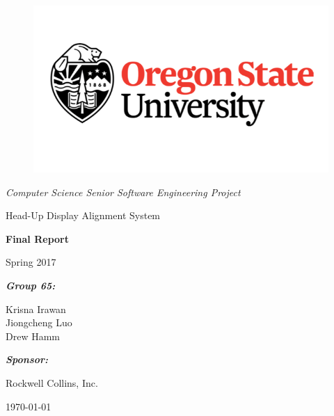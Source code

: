 \documentclass[letterpaper,10pt,onecolumn]{IEEEtran}
\def\title{Computer Science Senior Software Engineering Project}
\def\name{Krisna Irawan\\ Jiongcheng Luo\\ Drew Hamm}
\def\doc{Final Report}
\def\term{Spring 2017}
\def\project{Head-Up Display Alignment System}
\begin{document}
\begin{titlepage}
\centering
	\begin{figure}
      	\includegraphics[scale=0.35]{osu_logo}
	\end{figure}
	{\huge\itshape \title\par}
	\vspace{1cm}
	\scshape{
		{\huge \project\par}

		\vspace{2cm}
		{\Huge\bfseries\doc\par}
		{\huge \term\par}
	}
	\vspace{2cm}
	{\large\itshape\bfseries Group 65:\par}
	{\large \name\par}
	\vspace{1cm}
	{\large\itshape\bfseries Sponsor:\par}
	{\large Rockwell Collins, Inc.\par}
	\vspace{1.5cm}
	{\large \today\par}
	\vspace{2cm}

	\begin{abstract}
		Currently, a Head-up Display (HUD) obtains flight data from an Inertial Measurement Unit (IMU) on the airplane. However, the current HUD installation process requires specialized equipment and epoxy which is time consuming, costly, and interrupts production line progress for the manufacturer. In order to improve the current HUD alignment systems, Rockwell Collins, seeks a new alignment methodology that utilizes HUD mounted IMUs, aims to reduce the installation cost and time required to precisely align flight information to the HUD. This report contains all detailed documentations and records over the design and implementation of the project.


	\end{abstract}
	\vfill

\end{titlepage}
\tableofcontents
\end{document}

